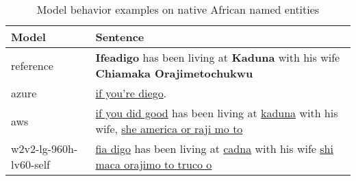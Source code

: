 \documentclass{INTERSPEECH2023}
\begin{document}


\begin{table*}[t]
\caption{Model behavior examples on native African named entities}
\centering
\small
\begin{tabularx}{\textwidth}{l|X}
\toprule
Model & Sentence\\
\hline
reference & \textbf{Ifeadigo} has been living at \textbf{Kaduna} with his wife \textbf{Chiamaka Orajimetochukwu} \\
\hline

azure & \underline{if you're diego}. \\


aws & \underline{if you did good} has been living at \underline{kaduna} with his wife, \underline{she america or raji mo to} \\



w2v2-lg-960h-lv60-self & \underline{fia digo} has been living at \underline{cadna} with his wife \underline{shi maca orajimo to truco o} \\




\end{tabularx}
\end{table*}
\end{document}
